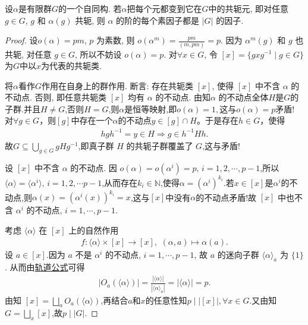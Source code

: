 \documentclass[../../main.tex]{subfiles}%
\begin{document}
\begin{example}
设$\alpha$是有限群$G$的一个自同构. 若$\alpha$把每个元都变到它在$G$中的共轭元, 即对任意$g \in G$, $g$ 和 $\alpha(g)$ 共轭, 则 $\alpha$ 的阶的每个素因子都是 $|G|$ 的因子.
\end{example}
\begin{proof}
设$o(\alpha) = pm$, $p$ 为素数, 则 $o(\alpha^m) = \frac{pm}{(m, pm)} = p$. 因为 $\alpha^m(g)$ 和 $g$ 也共轭, 对任意 $g \in G$, 所以不妨设 $o(\alpha) = p$. 对$\forall x \in G$, 令 $[x] = \{gxg^{-1} \mid g \in G\}$为$G$中以$x$为代表的共轭类.

将$\alpha$看作$G$作用在自身上的群作用.
断言: 存在共轭类 $[x]$, 使得 $[x]$ 中不含 $\alpha$ 的不动点.
否则, 即任意共轭类 $[x]$ 均有 $\alpha$ 的不动点. 由知$\alpha$ 的不动点全体$H$是$G$的子群.并且$H \neq G$,否则$H=G$,则$\alpha$是恒等映射,即$o(\alpha)=1,$这与$o(\alpha)=p$矛盾!
对$\forall g\in G$，则$[g]$中存在一个$\alpha$的不动点$y\in [g]\cap H$。于是存在$h\in G$，使得\begin{align*}
hgh^{-1}=y\in H\Longrightarrow g\in h^{-1}Hh.
\end{align*}
故$G\subseteq \bigcup\limits_{g\in G}gHg^{-1}$,即真子群 $H$ 的共轭子群覆盖了 $G$,这与矛盾!

设 $[x]$ 中不含 $\alpha$ 的不动点. 因 $o(\alpha) =o(\alpha^i)= p,\,i=1,2,\cdots,p-1$,所以$\langle \alpha\rangle=\langle \alpha^i\rangle,\,i=1,2,\cdots p-1$,从而存在$k_i\in \mathbb{N}$,使得$\alpha =(\alpha^i)^{k_i}$.若$x\in [x]$是$\alpha^i$的不动点,则$\alpha(x)=(\alpha^i(x))^{k_i}=x$,这与$[x]$中没有$\alpha$的不动点矛盾!故 $[x]$ 中也不含 $\alpha^i$ 的不动点, $i = 1, \cdots, p-1$. 

考虑 $\langle \alpha \rangle$ 在 $[x]$ 上的自然作用
\begin{align*}
f:\langle \alpha\rangle \times [x]\to [x],\,\,(\alpha,a)\mapsto \alpha(a).
\end{align*}
设 $a \in [x]$.因为 $a$ 不是 $\alpha^i$ 的不动点, $i = 1, \cdots, p-1$, 故 $a$ 的迷向子群 $\langle \alpha \rangle_a$ 为 $\{1\}$. 从而由\hyperref[corollary:有限群轨道的阶与其商掉迷向子群的阶相同]{轨道公式}可得
\begin{align*}
|O_a(\langle \alpha \rangle)| = \frac{|\langle \alpha \rangle|}{|\langle \alpha \rangle_a|} = |\langle \alpha \rangle| = p.
\end{align*}
由知 $[x] = \bigsqcup\limits_{a} O_a(\langle \alpha \rangle)$,再结合$a$和$x$的任意性知$p \mid |[x]|,\forall x\in G$.又由知$G=\bigsqcup\limits_{x}[x]$,故$p\mid |G|$.
\end{proof}
\end{document}

